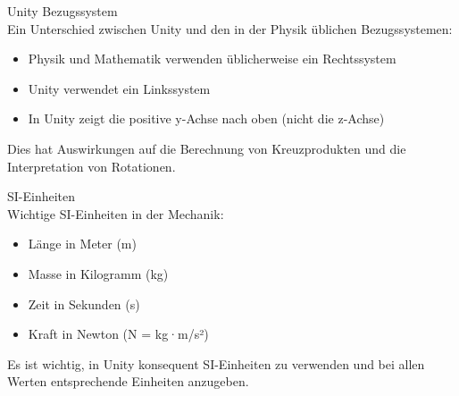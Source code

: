 \begin{example2}{Unity Bezugssystem}\\
    Ein Unterschied zwischen Unity und den in der Physik üblichen Bezugssystemen:
    \begin{itemize}
        \item Physik und Mathematik verwenden üblicherweise ein Rechtssystem
        \item Unity verwendet ein Linkssystem
        \item In Unity zeigt die positive y-Achse nach oben (nicht die z-Achse)
    \end{itemize}
    
    Dies hat Auswirkungen auf die Berechnung von Kreuzprodukten und die Interpretation von Rotationen.
\end{example2}

\begin{definition}{SI-Einheiten}\\
    Wichtige SI-Einheiten in der Mechanik:
    \begin{itemize}
        \item Länge in Meter (m)
        \item Masse in Kilogramm (kg)
        \item Zeit in Sekunden (s)
        \item Kraft in Newton (N = kg·m/s²)
    \end{itemize}
    Es ist wichtig, in Unity konsequent SI-Einheiten zu verwenden und bei allen Werten entsprechende Einheiten anzugeben.
\end{definition}

